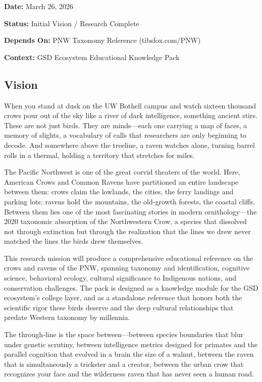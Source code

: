\documentclass[11pt,letterpaper]{article}
\newcommand{\metafield}[2]{\textbf{\sffamily #1} #2\par}
\begin{document}
\metafield{Date:}{March 26, 2026}
\metafield{Status:}{Initial Vision / Research Complete}
\metafield{Depends On:}{PNW Taxonomy Reference (tibsfox.com/PNW)}
\metafield{Context:}{GSD Ecosystem Educational Knowledge Pack}

\subsection{Vision}

When you stand at dusk on the UW Bothell campus and watch sixteen thousand crows pour out of the sky like a river of dark intelligence, something ancient stirs. These are not just birds. They are minds---each one carrying a map of faces, a memory of slights, a vocabulary of calls that researchers are only beginning to decode. And somewhere above the treeline, a raven watches alone, turning barrel rolls in a thermal, holding a territory that stretches for miles.

The Pacific Northwest is one of the great corvid theaters of the world. Here, American Crows and Common Ravens have partitioned an entire landscape between them: crows claim the lowlands, the cities, the ferry landings and parking lots; ravens hold the mountains, the old-growth forests, the coastal cliffs. Between them lies one of the most fascinating stories in modern ornithology---the 2020 taxonomic absorption of the Northwestern Crow, a species that dissolved not through extinction but through the realization that the lines we drew never matched the lines the birds drew themselves.

This research mission will produce a comprehensive educational reference on the crows and ravens of the PNW, spanning taxonomy and identification, cognitive science, behavioral ecology, cultural significance to Indigenous nations, and conservation challenges. The pack is designed as a knowledge module for the GSD ecosystem's college layer, and as a standalone reference that honors both the scientific rigor these birds deserve and the deep cultural relationships that predate Western taxonomy by millennia.

The through-line is the space between---between species boundaries that blur under genetic scrutiny, between intelligence metrics designed for primates and the parallel cognition that evolved in a brain the size of a walnut, between the raven that is simultaneously a trickster and a creator, between the urban crow that recognizes your face and the wilderness raven that has never seen a human road.
\end{document}
